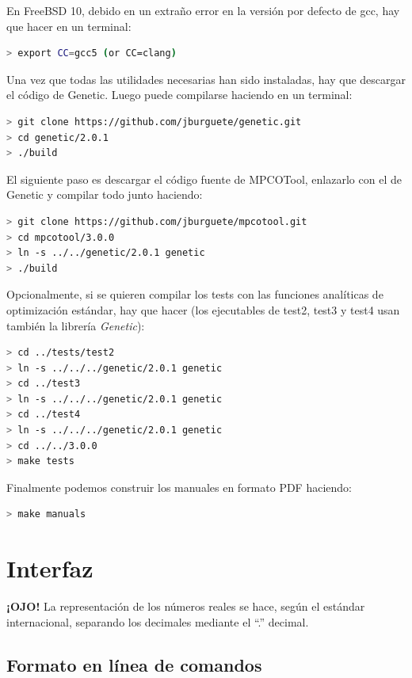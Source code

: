 \documentclass[a4paper]{report}
\begin{document}
En FreeBSD 10, debido en un extraño error en la versión por defecto de gcc, hay
que hacer en un terminal:
\begin{lstlisting}[language=bash,basicstyle=\scriptsize]
> export CC=gcc5 (or CC=clang)
\end{lstlisting}

Una vez que todas las utilidades necesarias han sido instaladas, hay que
descargar el código de Genetic. Luego puede compilarse haciendo en un terminal:
\begin{lstlisting}[language=bash,basicstyle=\scriptsize]
> git clone https://github.com/jburguete/genetic.git
> cd genetic/2.0.1
> ./build
\end{lstlisting}

El siguiente paso es descargar el código fuente de MPCOTool, enlazarlo con el
de Genetic y compilar todo junto haciendo:
\begin{lstlisting}[language=bash,basicstyle=\scriptsize]
> git clone https://github.com/jburguete/mpcotool.git
> cd mpcotool/3.0.0
> ln -s ../../genetic/2.0.1 genetic
> ./build
\end{lstlisting}

Opcionalmente, si se quieren compilar los tests con las funciones analíticas de
optimización estándar, hay que hacer (los ejecutables de test2, test3 y test4
usan también la librería \emph{Genetic}):
\begin{lstlisting}[language=bash,basicstyle=\scriptsize]
> cd ../tests/test2
> ln -s ../../../genetic/2.0.1 genetic
> cd ../test3
> ln -s ../../../genetic/2.0.1 genetic
> cd ../test4
> ln -s ../../../genetic/2.0.1 genetic
> cd ../../3.0.0
> make tests
\end{lstlisting}

Finalmente podemos construir los manuales en formato PDF haciendo:
\begin{lstlisting}[language=bash,basicstyle=\scriptsize]
> make manuals
\end{lstlisting}

\chapter{Interfaz}

{\bf ¡OJO!} La representación de los números reales se hace, según el estándar
internacional, separando los decimales mediante el ``.'' decimal.

\section{Formato en línea de comandos}
\end{document}
